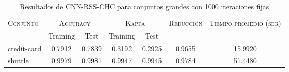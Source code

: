 \begin{table}[]
\centering
\begin{tabular}{l c c c c c c}
\hline
\multirow{2}{*}{\textsc{Conjunto}}
	& \multicolumn{2}{c}{\textsc{Accuracy}}
	& \multicolumn{2}{c}{\textsc{Kappa}}
	& \textsc{Reducción}
	& \textsc{Tiempo promedio (seg)} \\
	& Training & Test
	& Training & Test \\ 
\hline
\hline

credit-card & 0.7912 & 0.7839 & 0.3192 & 0.2925 & 0.9655 & 15.9920 \\
shuttle & 0.9979 & 0.9981 & 0.9947 & 0.9945 & 0.9784 & 51.4480 \\

\hline
\end{tabular}
\caption{Resultados de CNN-RSS-CHC para conjuntos grandes con 1000 iteraciones fijas}
\label{res-grande-CNN-RSS-CHC}
\end{table}

